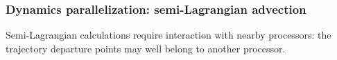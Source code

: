 \documentclass[aspectratio=43,9pt]{beamer}
\begin{document}
\begin{frame}
	\frametitle{Dynamics parallelization: semi-Lagrangian advection}
	\begin{myitemize}{2ex}
		\item Semi-Lagrangian calculations require interaction with nearby processors: the trajectory departure points may well belong to another processor.
			\begin{center}
			\end{center}
	\end{myitemize}
\end{frame}
%
%
\end{document}
